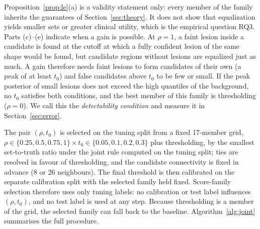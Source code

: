 \documentclass[sn-mathphys-num]{sn-jnl}%
\theoremstyle{thmstyleone}
\theoremstyle{thmstyletwo}
\theoremstyle{thmstylethree}
\newcommand{\1}{\mathbb{1}}
\begin{document}
Proposition~\ref{prop:le}(a) is a validity statement only: every member of the family inherits the guarantees of Section~\ref{sec:theory}. It does not show that equalization yields smaller sets or greater clinical utility, which is the empirical question RQ3. Parts (c)--(e) indicate when a gain is possible. At $\rho=1$, a faint lesion inside a candidate is found at the cutoff at which a fully confident lesion of the same shape would be found, but candidate regions without lesions are equalized just as much. A gain therefore needs faint lesions to form candidates of their own (a peak of at least $t_0$) and false candidates above $t_0$ to be few or small. If the peak posterior of small lesions does not exceed the high quantiles of the background, no $t_0$ satisfies both conditions, and the best member of this family is thresholding ($\rho=0$). We call this the \emph{detectability condition} and measure it in Section~\ref{sec:error}.

The pair $(\rho,t_0)$ is selected on the tuning split from a fixed 17-member grid, $\rho\in\{0.25,0.5,0.75,1\}\times t_0\in\{0.05,0.1,0.2,0.3\}$ plus thresholding, by the smallest set-to-truth ratio under the joint rule computed on the tuning split; ties are resolved in favour of thresholding, and the candidate connectivity is fixed in advance (8 or 26 neighbours). The final threshold is then calibrated on the separate calibration split with the selected family held fixed. Score-family selection therefore uses only tuning labels: no calibration or test label influences $(\rho,t_0)$, and no test label is used at any step. Because thresholding is a member of the grid, the selected family can fall back to the baseline. Algorithm~\ref{alg:joint} summarises the full procedure.
\end{document}
